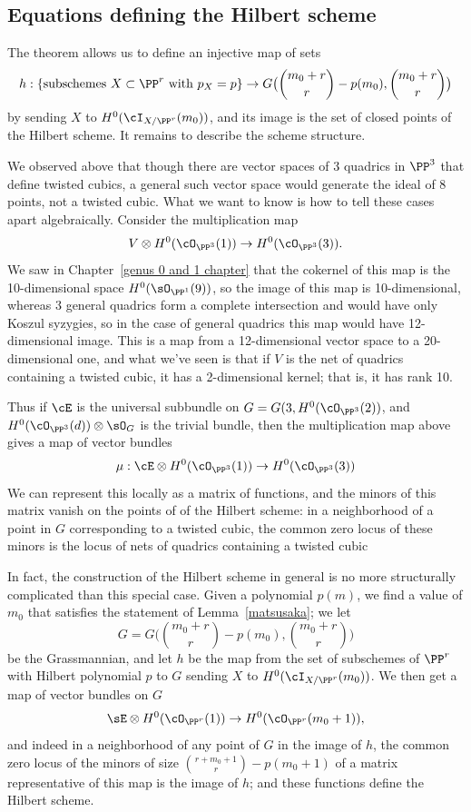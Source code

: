  \subsection{Equations defining the Hilbert scheme}\label{eqns of Hilb}

The theorem allows us to define an injective map of sets
$$
h : \left\{ \text{subschemes $X \subset \PP^r$ with $p_X=p$} \right\}  \to G\big(\binom{m_0+r}{r} - p(m_0),\binom{m_0+r}{r} \big)
$$
by sending $X$ to $H^0(\cI_{X/\PP^r}(m_0))$, and its image is the set of closed points of the Hilbert scheme.
It remains to describe the scheme structure.

We observed above that though there are vector spaces of 3 quadrics in $\PP^{3}$ that define
twisted cubics, a general such vector space  would generate the ideal of
8 points,  not a twisted cubic. What we want to know is how to tell these cases apart algebraically. Consider the multiplication map
$$
V \otimes H^0(\cO_{\PP^3}(1)) \to H^0(\cO_{\PP^3}(3)).
$$
We saw in Chapter~\ref{genus 0 and 1 chapter} that the cokernel of this map is the 10-dimensional space $H^0(\sO_{\PP^1}(9))$, so the image of this map is 10-dimensional, whereas
3 general quadrics form a complete intersection and would have only Koszul syzygies, so
in the case of general quadrics this map would have 12-dimensional image.
This is a map from a 12-dimensional vector space to a 20-dimensional one, and what we've seen is that if $V$ is the net of quadrics containing a twisted cubic, it has a 2-dimensional kernel; that is, it has rank 10. 

Thus if $\cE$ is the universal subbundle on $G = G(3, H^0(\cO_{\PP^3}(2))$, and  $H^0(\cO_{\PP^3}(d))\otimes \sO_G$ is the trivial bundle, then the multiplication map above gives a map of vector bundles
$$
\mu: \cE \otimes H^0(\cO_{\PP^3}(1)) \to H^0(\cO_{\PP^3}(3))
$$
We can represent this locally as a matrix of functions, and the minors of this matrix vanish on the points of
of the Hilbert scheme: in a neighborhood of a point in $G$ corresponding to a twisted cubic, the common zero locus of these minors is the locus of nets of quadrics containing a twisted cubic


In fact, the construction of the Hilbert scheme in general is no more structurally complicated than this special case. Given a polynomial $p(m)$, we find a value of $m_0$ that satisfies the statement of Lemma~\ref{matsusaka}; we let
$$
G = G\big(\binom{m_0+r}{r} - p(m_0), \binom{m_0+r}{r} \big)
$$
be the Grassmannian, and let $h$ be the map from the set of subschemes of $\PP^r$ with Hilbert polynomial $p$ to $G$ sending $X$ to $H^0(\cI_{X/\PP^r}(m_0))$. We then get a map of vector bundles  on $G$
$$
\sE \otimes H^0(\cO_{\PP^r}(1)) \to H^0(\cO_{\PP^r}(m_0+1)),
$$
and indeed in a neighborhood of any point of $G$ in the image of $h$, the common zero locus of the minors of size $\binom{r+m_0+1}{r} - p(m_0+1)$ of a matrix representative of this map is the image of $h$; and these functions define the Hilbert scheme.

